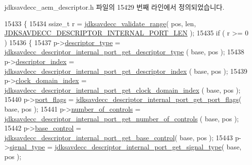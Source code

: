 jdksavdecc\+\_\+aem\+\_\+descriptor.\+h 파일의 15429 번째 라인에서 정의되었습니다.


\begin{DoxyCode}
15433 \{
15434     ssize\_t r = \hyperlink{group__util_ga9c02bdfe76c69163647c3196db7a73a1}{jdksavdecc\_validate\_range}( pos, len, 
      \hyperlink{group__descriptor__internal__port_gac3707c07b819a8bace60978c44d34598}{JDKSAVDECC\_DESCRIPTOR\_INTERNAL\_PORT\_LEN} );
15435     \textcolor{keywordflow}{if} ( r >= 0 )
15436     \{
15437         p->\hyperlink{structjdksavdecc__descriptor__internal__port_ab7c32b6c7131c13d4ea3b7ee2f09b78d}{descriptor\_type} = 
      \hyperlink{group__descriptor__internal__port_gad5363efc03804b8e673e7cf5b92d153e}{jdksavdecc\_descriptor\_internal\_port\_get\_descriptor\_type}
      ( base, pos );
15438         p->\hyperlink{structjdksavdecc__descriptor__internal__port_a042bbc76d835b82d27c1932431ee38d4}{descriptor\_index} = 
      \hyperlink{group__descriptor__internal__port_gadf62273d7e25f9e5f55483b9336d857c}{jdksavdecc\_descriptor\_internal\_port\_get\_descriptor\_index}
      ( base, pos );
15439         p->\hyperlink{structjdksavdecc__descriptor__internal__port_a6608f023d147b556a49527d568abed8e}{clock\_domain\_index} = 
      \hyperlink{group__descriptor__internal__port_gaa2fc99cc0fb83ba752ea98fdbe342b44}{jdksavdecc\_descriptor\_internal\_port\_get\_clock\_domain\_index}
      ( base, pos );
15440         p->\hyperlink{structjdksavdecc__descriptor__internal__port_a60a1f1704542df3b3f6e6db56622ddd9}{port\_flags} = 
      \hyperlink{group__descriptor__internal__port_ga6a26b630da20cebe40f8a93d1ea2e11b}{jdksavdecc\_descriptor\_internal\_port\_get\_port\_flags}( base,
       pos );
15441         p->\hyperlink{structjdksavdecc__descriptor__internal__port_a0104bea638bdadf1a547c2b93813e22f}{number\_of\_controls} = 
      \hyperlink{group__descriptor__internal__port_gaad13876a68a22d37aceb566566729e13}{jdksavdecc\_descriptor\_internal\_port\_get\_number\_of\_controls}
      ( base, pos );
15442         p->\hyperlink{structjdksavdecc__descriptor__internal__port_af06eac7dd98377a85258308e8a25e7f2}{base\_control} = 
      \hyperlink{group__descriptor__internal__port_gafcb5b5c708503347ab874677759ad7ad}{jdksavdecc\_descriptor\_internal\_port\_get\_base\_control}( 
      base, pos );
15443         p->\hyperlink{structjdksavdecc__descriptor__internal__port_a248e60ef99d5ed1779989d1dd6b6dc5a}{signal\_type} = 
      \hyperlink{group__descriptor__internal__port_gae6f4e14e3512a29342eda896d7f4bade}{jdksavdecc\_descriptor\_internal\_port\_get\_signal\_type}( 
      base, pos );

\end{DoxyCode}
